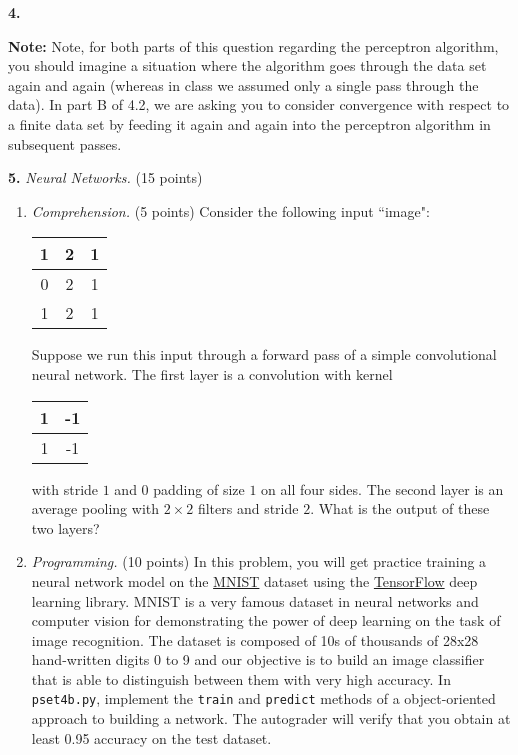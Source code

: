 \documentclass[12pt]{amsart}
\newenvironment{statement}[1]{\smallskip\noindent\color[rgb]{0.0,0.0,0.0} {\bf #1.}}{}
\newcommand{\1}{\mathds{1}}
\begin{document}
\begin{statement}{4}
\begin{enumerate}
\begin{enumerate}
        \textbf{Note:} Note, for both parts of this question regarding the perceptron algorithm, you should imagine a situation where the algorithm goes through the data set again and again (whereas in class we assumed only a single pass through the data). In part B of 4.2, we are asking you to consider convergence with respect to a finite data set by feeding it again and again into the perceptron algorithm in subsequent passes.
    \end{enumerate} 
    
\end{enumerate}
\end{statement}

\newpage

\begin{statement}{5}
\textit{Neural Networks.} (15 points)
\begin{enumerate}
    \item \textit{Comprehension.} (5 points) Consider the following input ``image":
    \begin{table}[H]
    \begin{tabular}{|c|c|c|}
    \hline
    1 & 2 & 1 \\ \hline
    0 & 2 & 1 \\ \hline
    1 & 2 & 1 \\ \hline
    \end{tabular}
    \end{table}
    \noindent
    Suppose we run this input through a forward pass of a simple convolutional neural network. The first layer is a convolution with kernel 
    \begin{table}[H]
    \begin{tabular}{|c|c|}
    \hline
    1 & -1 \\ \hline
    1 & -1 \\ \hline
    \end{tabular}
    \end{table}
    \noindent
    with stride $1$ and 0 padding of size $1$ on all four sides. The second layer is an average pooling with $2\times 2$ filters and stride $2$. What is the output of these two layers?
    
    \item \textit{Programming.} (10 points) In this problem, you will get practice training a neural network model on the \href{https://en.wikipedia.org/wiki/MNIST_database}{MNIST} dataset using the \href{https://www.tensorflow.org/api_docs/python/tf/keras}{TensorFlow} deep learning library. MNIST is a very famous dataset in neural networks and computer vision for demonstrating the power of deep learning on the task of image recognition. The dataset is composed of 10s of thousands of 28x28 hand-written digits 0 to 9 and our objective is to build an image classifier that is able to distinguish between them with very high accuracy. In \texttt{pset4b.py}, implement the \texttt{train} and \texttt{predict} methods of a object-oriented approach to building a network. The autograder will verify that you obtain at least 0.95 accuracy on the test dataset.
\end{enumerate}
\end{statement}
\end{document}
